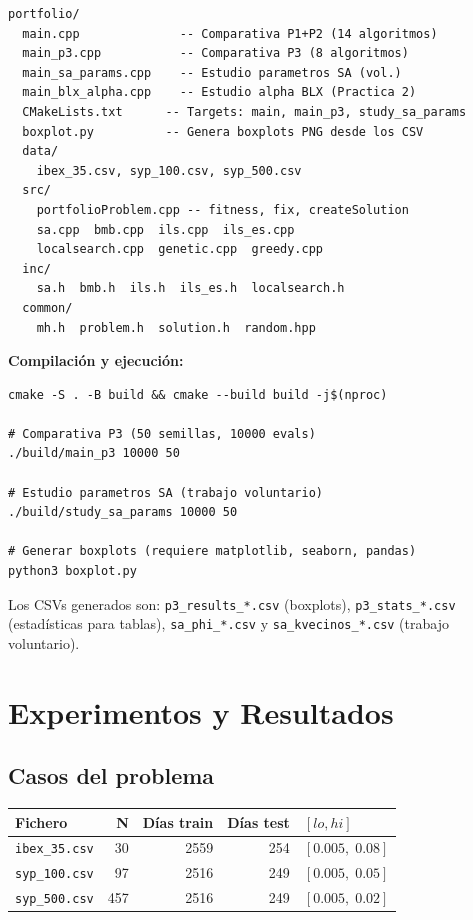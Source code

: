 \documentclass[12pt,a4paper]{article}
\begin{document}
\begin{verbatim}
portfolio/
  main.cpp              -- Comparativa P1+P2 (14 algoritmos)
  main_p3.cpp           -- Comparativa P3 (8 algoritmos)
  main_sa_params.cpp    -- Estudio parametros SA (vol.)
  main_blx_alpha.cpp    -- Estudio alpha BLX (Practica 2)
  CMakeLists.txt      -- Targets: main, main_p3, study_sa_params
  boxplot.py          -- Genera boxplots PNG desde los CSV
  data/
    ibex_35.csv, syp_100.csv, syp_500.csv
  src/
    portfolioProblem.cpp -- fitness, fix, createSolution
    sa.cpp  bmb.cpp  ils.cpp  ils_es.cpp
    localsearch.cpp  genetic.cpp  greedy.cpp
  inc/
    sa.h  bmb.h  ils.h  ils_es.h  localsearch.h
  common/
    mh.h  problem.h  solution.h  random.hpp
\end{verbatim}

\textbf{Compilación y ejecución:}
\begin{verbatim}
cmake -S . -B build && cmake --build build -j$(nproc)

# Comparativa P3 (50 semillas, 10000 evals)
./build/main_p3 10000 50

# Estudio parametros SA (trabajo voluntario)
./build/study_sa_params 10000 50

# Generar boxplots (requiere matplotlib, seaborn, pandas)
python3 boxplot.py
\end{verbatim}

Los CSVs generados son: \texttt{p3\_results\_*.csv} (boxplots),
\texttt{p3\_stats\_*.csv} (estadísticas para tablas),
\texttt{sa\_phi\_*.csv} y \texttt{sa\_kvecinos\_*.csv} (trabajo voluntario).

\section{Experimentos y Resultados}
\label{sec:experimentos}

\subsection{Casos del problema}

\begin{center}
\begin{tabular}{lrrrl}
\toprule
\textbf{Fichero} & \textbf{N} & \textbf{Días train} & \textbf{Días test} & \textbf{$[lo, hi]$} \\
\midrule
\texttt{ibex\_35.csv}  & 30  & 2559 & 254 & $[0.005,\;0.08]$ \\
\texttt{syp\_100.csv}  & 97  & 2516 & 249 & $[0.005,\;0.05]$ \\
\texttt{syp\_500.csv}  & 457 & 2516 & 249 & $[0.005,\;0.02]$ \\
\bottomrule
\end{tabular}
\end{center}
\end{document}

